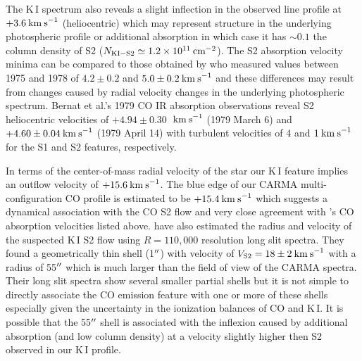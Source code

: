 \documentclass[iop]{emulateapj}
\begin{document}
The K\,I spectrum also reveals a slight inflection in the observed line profile at $+3.6\>{\rm km\>s}^{-1}$ (heliocentric) which may represent structure in the underlying photospheric profile or additional absorption in which case it has $\sim 0.1$ the column density of S2 ($N_{\rm{KI-S2}}\simeq 1.2\times 10^{11}\>{\rm cm}^{-2}$).  The S2 absorption velocity minima can be compared to those obtained by \citet[Figure 7]{1979QJRAS..20..361G} who measured values between 1975 and 1978 of $4.2\pm 0.2$ and $5.0\pm 0.2 \>{\rm km\>s}^{-1}$ and these differences may result from changes caused by radial velocity changes in the underlying photospheric spectrum. Bernat et al.'s 1979 CO IR absorption observations reveal S2 heliocentric velocities of $+4.94\pm 0.30$ $\>{\rm km\>s}^{-1}$ (1979 March 6) and $+4.60\pm 0.04 \>{\rm km\>s}^{-1}$ (1979 April 14) with turbulent velocities of 4 and $1\>{\rm km\>s}^{-1}$ for the S1 and S2 features, respectively.

In terms of the center-of-mass radial velocity of the star our K\,I feature implies an outflow velocity of $+15.6\>{\rm km\>s}^{-1}$. The blue edge of our CARMA multi-configuration CO profile is estimated to be $+15.4\>{\rm km\>s}^{-1}$  which suggests a dynamical association with the CO S2 flow and very close agreement with \citeauthor{1979ApJ...233L.135B}'s \citeyearpar{1979ApJ...233L.135B} CO absorption velocities listed above. \cite{2002A&A...386.1009P} have also estimated the radius and velocity of the suspected K\,I S2 flow using $R=110,000$ resolution long slit spectra. They found a geometrically thin shell (1$\mbox{$^{\prime\prime}$}$) with velocity of $V_{\rm{S2}}=18\pm 2\>{\rm km\>s}^{-1}$ with a radius of 55$\mbox{$^{\prime\prime}$}$ which is much larger than the field of view of the CARMA spectra. Their long slit spectra show several smaller partial shells but it is not simple to directly associate the CO emission feature with one or more of these shells especially given the uncertainty in the ionization balances of CO and K\,I. It is possible that the 55$\mbox{$^{\prime\prime}$}$ shell is associated with the inflexion caused by additional absorption (and low column density) at a velocity slightly higher then S2 observed in our K\,I profile.
\end{document}
